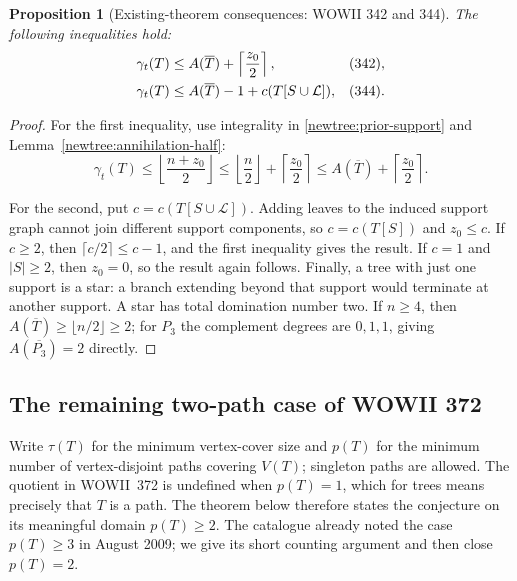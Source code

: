 \documentclass[11pt,a4paper]{article}
\newtheorem{proposition}[theorem]{Proposition}
\theoremstyle{remark}
\begin{document}
\begin{proposition}[Existing-theorem consequences: WOWII 342 and 344]
\label{newtree:342-344}
The following inequalities hold:
\begin{align*}
 \gamma_t(T)&\leq A(\overline T)+\left\lceil\frac{z_0}{2}\right\rceil,
 &&\textup{(342)},\\
 \gamma_t(T)&\leq A(\overline T)-1+c(T[S\cup\mathcal L]),
 &&\textup{(344)}.
\end{align*}
\end{proposition}
\begin{proof}
For the first inequality, use integrality in
\eqref{newtree:prior-support} and Lemma~\ref{newtree:annihilation-half}:
\[
 \gamma_t(T)\leq\left\lfloor\frac{n+z_0}{2}\right\rfloor
 \leq\left\lfloor\frac n2\right\rfloor+\left\lceil\frac{z_0}{2}\right\rceil
 \leq A(\overline T)+\left\lceil\frac{z_0}{2}\right\rceil.
\]

For the second, put $c=c(T[S\cup\mathcal L])$.  Adding leaves to the
induced support graph cannot join different support components, so
$c=c(T[S])$ and $z_0\leq c$.  If $c\geq2$, then
$\lceil c/2\rceil\leq c-1$, and the first inequality gives the result.
If $c=1$ and $|S|\geq2$, then $z_0=0$, so the result again follows.
Finally, a tree with just one support is a star: a branch extending
beyond that support would terminate at another support.  A star has
total domination number two.  If $n\geq4$, then
$A(\overline T)\geq\lfloor n/2\rfloor\geq2$; for $P_3$ the complement
degrees are $0,1,1$, giving $A(\overline{P_3})=2$ directly.
\end{proof}

\subsection{The remaining two-path case of WOWII 372}

Write $\tau(T)$ for the minimum vertex-cover size and $p(T)$ for the
minimum number of vertex-disjoint paths covering $V(T)$; singleton paths
are allowed.  The quotient in WOWII~372 is undefined when $p(T)=1$,
which for trees means precisely that $T$ is a path.  The theorem below
therefore states the conjecture on its meaningful domain $p(T)\geq2$.
The catalogue already noted the case $p(T)\geq3$ in August 2009; we give
its short counting argument and then close $p(T)=2$.
\end{document}

